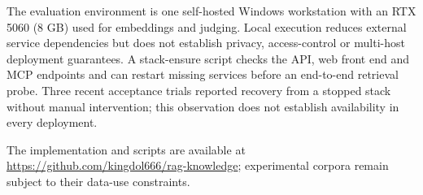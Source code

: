The evaluation environment is one self-hosted Windows workstation with an
RTX 5060 (8 GB) used for embeddings and judging. Local execution reduces
external service dependencies but does not establish privacy, access-control or
multi-host deployment guarantees. A stack-ensure script checks the API, web
front end and MCP endpoints and can restart missing services before an
end-to-end retrieval probe. Three recent acceptance trials reported recovery
from a stopped stack without manual intervention; this observation does not
establish availability in every deployment.

The implementation and scripts are available
at \url{https://github.com/kingdol666/rag-knowledge}; experimental corpora
remain subject to their data-use constraints.
